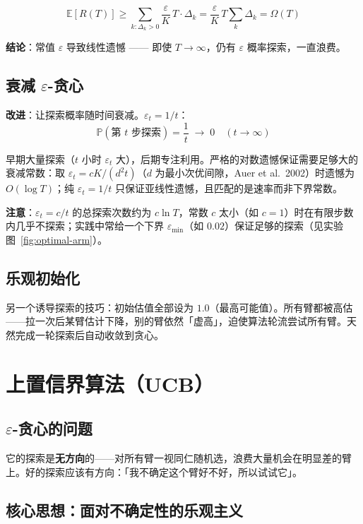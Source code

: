 \documentclass{article}
\begin{document}
\[
\mathbb{E}[R(T)] \ge \sum_{k: \Delta_k > 0} \frac{\varepsilon}{K}\,T \cdot \Delta_k = \frac{\varepsilon}{K}\,T\sum_k \Delta_k = \Omega(T)
\]

\textbf{结论}：常值 $\varepsilon$ 导致线性遗憾 —— 即使 $T \to \infty$，仍有 $\varepsilon$ 概率探索，一直浪费。

\subsection*{衰减 $\varepsilon$-贪心}

\textbf{改进}：让探索概率随时间衰减。$\varepsilon_t = 1/t$：
\[
\mathbb{P}(\text{第 } t \text{ 步探索}) = \frac{1}{t} \;\longrightarrow\; 0 \quad (t \to \infty)
\]

早期大量探索（$t$ 小时 $\varepsilon_t$ 大），后期专注利用。严格的对数遗憾保证需要足够大的衰减常数：取 $\varepsilon_t = cK/(d^2t)$（$d$ 为最小次优间隙，Auer et al.\ 2002）时遗憾为 $O(\log T)$；纯 $\varepsilon_t = 1/t$ 只保证亚线性遗憾，且匹配的是速率而非下界常数。

\textbf{注意}：$\varepsilon_t = c/t$ 的总探索次数约为 $c\ln T$，常数 $c$ 太小（如 $c=1$）时在有限步数内几乎不探索；实践中常给一个下界 $\varepsilon_{\min}$（如 $0.02$）保证足够的探索（见实验图~\ref{fig:optimal-arm}）。

\subsection*{乐观初始化}

另一个诱导探索的技巧：初始估值全部设为 $1.0$（最高可能值）。所有臂都被高估——拉一次后某臂估计下降，别的臂依然「虚高」，迫使算法轮流尝试所有臂。天然完成一轮探索后自动收敛到贪心。

\section*{上置信界算法（UCB）}

\subsection*{$\varepsilon$-贪心的问题}

它的探索是\textbf{无方向}的——对所有臂一视同仁随机选，浪费大量机会在明显差的臂上。好的探索应该有方向：「我不确定这个臂好不好，所以试试它」。

\subsection*{核心思想：面对不确定性的乐观主义}
\end{document}
